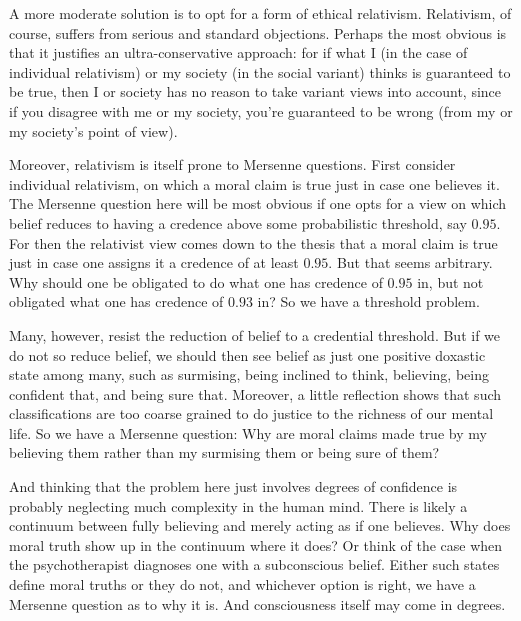 A more moderate solution is to opt for a form of ethical relativism. Relativism, of course, suffers from serious and
standard objections. Perhaps the most obvious is that it justifies an ultra-conservative approach: for if what
I (in the case of individual relativism) or my society (in the social variant) thinks is guaranteed to be true, then
I or society has no reason to take variant views into account, since if you disagree with me or my society, you're guaranteed to be 
wrong (from my or my society's point of view).

Moreover, relativism is itself prone to
Mersenne questions. First consider individual relativism, on which a moral claim is true just in case one believes
it. The Mersenne question here will be most obvious if one opts for a view on which belief reduces to having a
credence above some probabilistic threshold, say $0.95$. For then the relativist view comes down to the thesis
that a moral claim is true just in case one assigns it a credence of at least $0.95$. But that seems arbitrary.
Why should one be obligated to do what one has credence of $0.95$ in, but not obligated what one has credence of $0.93$ in?
So we have a threshold problem.

Many, however, resist the reduction of belief to a credential threshold. But if we do not so reduce belief, we should
then see belief as just one positive doxastic state among many, such as surmising, being inclined to think, believing,
being confident that, and being sure that. Moreover, a little reflection shows that
such classifications are too coarse grained to do justice to the richness of our mental life. So we have a Mersenne
question: Why are moral claims made true by my believing them rather than my surmising them or being sure of them?

And thinking that the problem here just involves degrees of confidence is probably neglecting much complexity in the human
mind. There is likely a continuum between fully believing and merely acting as if one believes. Why does moral truth show up
in the continuum where it does? Or think of the case when the psychotherapist diagnoses one with a subconscious belief.
Either such states define moral truths or they do not, and whichever option is right, we have a Mersenne question as to why it is. And consciousness
itself may come in degrees.


